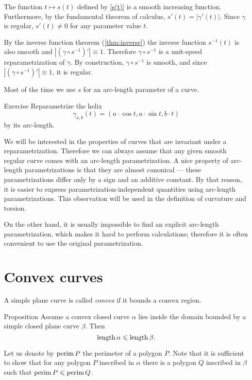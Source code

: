  The function $t\mapsto s(t)$ defined by \ref{s(t)} is a smooth increasing function.
Furthermore, by the fundamental theorem of calculus, $s'(t)=|\gamma'(t)|$.
Since $\gamma$ is regular, $s'(t)\ne0$ for any parameter value $t$.

By the inverse function theorem (\ref{thm:inverse}) the inverse function $s^{-1}(t)$ is also smooth
and $|(\gamma\circ s^{-1})'|\equiv1$.
Therefore $\gamma\circ s^{-1}$ is a unit-speed reparametrization  of $\gamma$.
By construction, $\gamma\circ s^{-1}$ is smooth, and since $|(\gamma\circ s^{-1})'|\equiv1$, it is regular.
\qeds

Most of the time we use $s$ for an arc-length parameter of a curve.

\begin{thm}{Exercise}\label{ex:arc-length-helix}
Reparametrize the helix 
\[\gamma_{a,b}(t)=(a\cdot\cos t,a\cdot \sin t, b\cdot t)\]
by its arc-length.
\end{thm}

We will be interested in the properties of curves that are invariant under a reparametrization.
Therefore we can always assume that any given smooth regular curve comes with an arc-length parametrization.
A nice property of arc-length parametrizations is that they are almost canonical --- these parametrizations differ only by a sign and an additive constant.
By that reason, it is easier to express parametrization-independent quantities using arc-length parametrizations.
This observation will be used in the definition of curvature and torsion.

On the other hand, it is usually impossible to find an explicit arc-length parametrization, which makes it hard to perform calculations;
therefore it is often convenient to use the original parametrization.

\section{Convex curves}

A simple plane curve is called \emph{convex} if it bounds a convex region.

\begin{thm}{Proposition}\label{prop:convex-curve}
Assume a convex closed curve $\alpha$ lies inside the domain bounded by a simple closed plane curve $\beta$.
Then
\[\mathop{\rm length}\nolimits\alpha\leqslant \mathop{\rm length}\nolimits\beta.\]
\end{thm}

Let us denote by $\mathop{\rm perim}\nolimits P$ the perimeter of a polygon $P$.
Note that it is sufficient to show that for any polygon  $P$ inscribed in $\alpha$ there is a polygon $Q$ inscribed in $\beta$ such that
$\mathop{\rm perim}\nolimits P\leqslant \mathop{\rm perim}\nolimits Q$.


